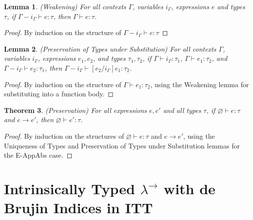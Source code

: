 \documentclass[12pt, letterpaper]{article}
\newtheorem{theorem}{Theorem}
\newtheorem{lemma}[theorem]{Lemma}
\begin{document}
\begin{flushleft}
\begin{lemma}
(Weakening) For all contexts $\Gamma$, variables $i_{\Gamma}$, expressions $e$ and types $\tau$, if $\Gamma - i_{\Gamma} \vdash e : \tau$, then $\Gamma \vdash e : \tau$.
\end{lemma}
\begin{proof}
By induction on the structure of $\Gamma - i_{\Gamma} \vdash e : \tau$
\end{proof}

\begin{lemma}
(Preservation of Types under Substitution) For all contexts $\Gamma$, variables $i_{\Gamma}$, expressions $e_1, e_2$, and types $\tau_1, \tau_2$, if $\Gamma \vdash i_{\Gamma} : \tau_1$, $\Gamma \vdash e_1 : \tau_2$, and $\Gamma - i_{\Gamma} \vdash e_2 : \tau_1$, then $\Gamma - i_{\Gamma} \vdash [e_2/i_{\Gamma}]e_1 : \tau_2$.
\end{lemma}
\begin{proof}
By induction on the structure of $\Gamma \vdash e_1 : \tau_2$, using the Weakening lemma for substituting into a function body.
\end{proof}

\begin{theorem}
(Preservation) For all expressions $e, e'$ and all types $\tau$, if $\varnothing \vdash e : \tau$ and $e \longrightarrow e'$, then $\varnothing \vdash e' : \tau$.
\end{theorem}
\begin{proof}
By induction on the structures of $\varnothing \vdash e : \tau$ and $e \longrightarrow e'$, using the Uniqueness of Types and Preservation of Types under Substitution lemmas for the E-AppAbs case.
\end{proof}
\end{flushleft}

\section{Intrinsically Typed $\lambda^{\to}$ with de Brujin Indices in ITT}
\end{document}
